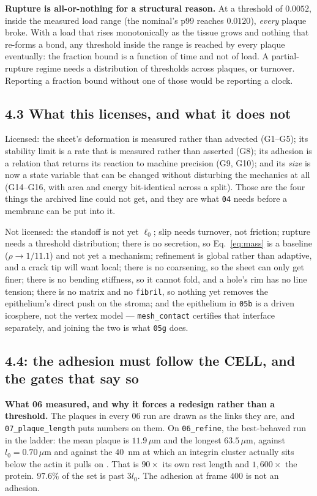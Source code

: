 \documentclass[10pt,a4paper]{article}
\newcommand{\op}[1]{\texttt{#1}}
\begin{document}
\textbf{Rupture is all-or-nothing for a structural reason.} At a threshold of $0.0052$, inside the
measured load range (the nominal's p99 reaches $0.0120$), \emph{every} plaque broke. With a load that
rises monotonically as the tissue grows and nothing that re-forms a bond, any threshold inside the range
is reached by every plaque eventually: the fraction bound is a function of time and not of load. A
partial-rupture regime needs a distribution of thresholds across plaques, or turnover. Reporting a
fraction bound without one of those would be reporting a clock.

\subsection*{4.3\; What this licenses, and what it does not}


Licensed: the sheet's deformation is measured rather than advected (G1--G5); its stability limit is a
rate that is measured rather than asserted (G8); its adhesion is a relation that returns its reaction to
machine precision (G9, G10); and its \emph{size} is now a state variable that can be changed without
disturbing the mechanics at all (G14--G16, with area and energy bit-identical across a split). Those are
the four things the archived line could not get, and they are what \op{04} needs before a membrane can
be put into it.

Not licensed: the standoff is not yet $\ell_0$; slip needs turnover, not friction; rupture needs a
threshold distribution; there is no secretion, so Eq.~\eqref{eq:mass} is a baseline ($\rho\to1/11.1$)
and not yet a mechanism; refinement is global rather than adaptive, and a crack tip will want local;
there is no coarsening, so the sheet can only get finer; there is no bending stiffness, so it cannot
fold, and a hole's rim has no line tension; there is no matrix and no \op{fibril}, so nothing yet
removes the epithelium's direct push on the stroma; and the epithelium in \op{05b} is a driven
icosphere, not the vertex model --- \op{mesh\_contact} certifies that interface separately, and joining
the two is what \op{05g} does.



\subsection*{4.4: the adhesion must follow the CELL, and the gates that say so}

\textbf{What 06 measured, and why it forces a redesign rather than a threshold.} The plaques in every
06 run are drawn as the links they are, and \op{07\_plaque\_length} puts numbers on them. On
\op{06\_refine}, the best-behaved run in the ladder: the mean plaque is $11.9\,\mu$m and the longest
$63.5\,\mu$m, against $l_0=0.70\,\mu$m and against the $40$~nm at which an integrin cluster actually
sits below the actin it pulls on \cite{kanchanawong2010}. That is $90\times$ its own rest length and
$1{,}600\times$ the protein. $97.6\%$ of the set is past $3l_0$. The adhesion at frame $400$ is not
an adhesion.
\end{document}
